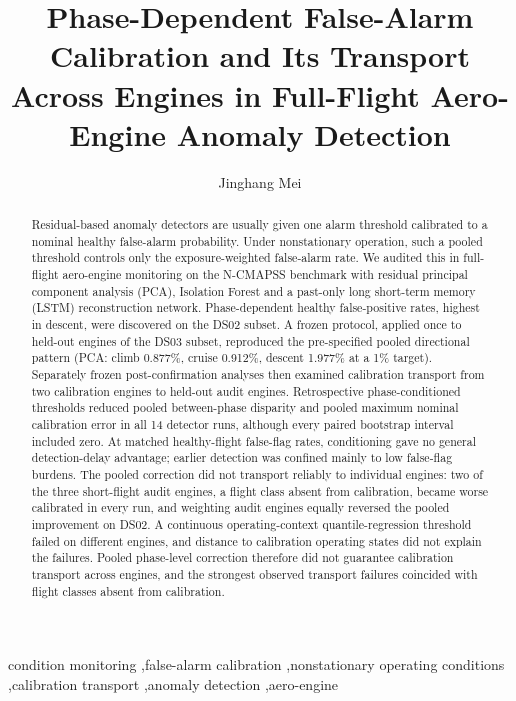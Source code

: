 \documentclass[preprint,11pt,a4paper]{elsarticle}
\begin{document}
\begin{frontmatter}
\title{Phase-Dependent False-Alarm Calibration and Its Transport Across Engines in Full-Flight Aero-Engine Anomaly Detection}
\author[usyd]{Jinghang Mei}
\address[usyd]{School of Electrical and Computer Engineering, The University of Sydney, Sydney, Australia}
\begin{abstract}
Residual-based anomaly detectors are usually given one alarm threshold calibrated to a nominal healthy false-alarm probability. Under nonstationary operation, such a pooled threshold controls only the exposure-weighted false-alarm rate. We audited this in full-flight aero-engine monitoring on the N-CMAPSS benchmark with residual principal component analysis (PCA), Isolation Forest and a past-only long short-term memory (LSTM) reconstruction network. Phase-dependent healthy false-positive rates, highest in descent, were discovered on the DS02 subset. A frozen protocol, applied once to held-out engines of the DS03 subset, reproduced the pre-specified pooled directional pattern (PCA: climb 0.877\%, cruise 0.912\%, descent 1.977\% at a 1\% target). Separately frozen post-confirmation analyses then examined calibration transport from two calibration engines to held-out audit engines. Retrospective phase-conditioned thresholds reduced pooled between-phase disparity and pooled maximum nominal calibration error in all 14 detector runs, although every paired bootstrap interval included zero. At matched healthy-flight false-flag rates, conditioning gave no general detection-delay advantage; earlier detection was confined mainly to low false-flag burdens. The pooled correction did not transport reliably to individual engines: two of the three short-flight audit engines, a flight class absent from calibration, became worse calibrated in every run, and weighting audit engines equally reversed the pooled improvement on DS02. A continuous operating-context quantile-regression threshold failed on different engines, and distance to calibration operating states did not explain the failures. Pooled phase-level correction therefore did not guarantee calibration transport across engines, and the strongest observed transport failures coincided with flight classes absent from calibration.
\end{abstract}
\begin{keyword}
condition monitoring \sep false-alarm calibration \sep nonstationary operating conditions \sep calibration transport \sep anomaly detection \sep aero-engine
\end{keyword}
\end{frontmatter}
\linenumbers
\end{document}
